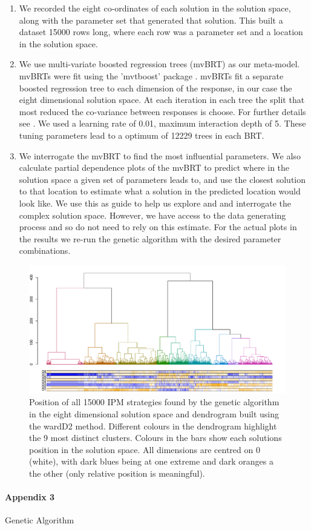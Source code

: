 \documentclass[12pt, a4paper]{article}
\begin{document}
\begin{enumerate}
\item We recorded the eight co-ordinates of each solution in the solution space, along with the parameter set that generated that solution. This built a dataset 15000 rows long, where each row was a parameter set and a location in the solution space.
\item We use multi-variate boosted regression trees (mvBRT) as our meta-model. mvBRTs were fit using the 'mvtboost' package \citep{Mill2016}. mvBRTs fit a separate boosted regression tree to each dimension of the response, in our case the eight dimensional solution space. At each iteration in each tree the split that most reduced the co-variance between responses is choose. For further details see \citep{Mill2016}. We used a learning rate of 0.01, maximum interaction depth of 5. These tuning parameters lead to a optimum of 12229 trees in each BRT.
\item We interrogate the mvBRT to find the most influential parameters. We also calculate partial dependence plots of the mvBRT to predict where in the solution space a given set of parameters leads to, and use the closest solution to that location to estimate what a solution in the predicted location would look like. We use this as guide to help us explore and and interrogate the complex solution space. However, we have access to the data generating process and so do not need to rely on this estimate. For the actual plots in the results we re-run the genetic algorithm with the desired parameter combinations.                  
\end{enumerate}       

\begin{figure}[!h]
	\includegraphics[width=170mm]{MS_figs/dend_9clust_NMDS_8D.pdf}
	\caption{Position of all 15000 IPM strategies found by the genetic algorithm in the eight dimensional solution space and dendrogram built using the wardD2 method. Different colours in the dendrogram highlight the 9 most distinct clusters. Colours in the bars show each solutions position in the solution space. All dimensions are centred on 0 (white), with dark blues being at one extreme and dark oranges a the other (only relative position is meaningful).} 
	\label{fig:clust_NMDS}
\end{figure}

\paragraph*{Appendix 3}
\label{app:GA}
Genetic Algorithm


 
\end{document}
